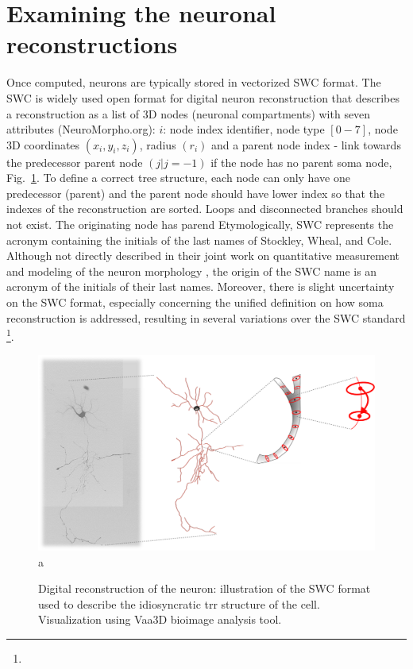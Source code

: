 \section{Examining the neuronal reconstructions}
Once computed, neurons are typically stored in vectorized SWC format. The SWC \cite{cannon1998line,ascoli2007neuromorpho} is widely used open format for digital neuron reconstruction that describes a reconstruction as a list of 3D nodes (neuronal compartments) with seven attributes (NeuroMorpho.org):  $i$: node index identifier, node type $[0-7]$, node 3D coordinates $(x_i,y_i,z_i)$, radius $(r_i)$ and a parent node index - link towards the predecessor parent node $(j | j=-1)$ if the node has no parent soma node, Fig.~\ref{ch1__fig5}. To define a correct tree structure, each node can only have one predecessor (parent) and the parent node should have lower index so that the indexes of the reconstruction are sorted. Loops and disconnected branches should not exist. The originating node has parend  Etymologically, SWC represents the acronym containing the initials of the last names of Stockley, Wheal, and Cole. Although not directly described in their joint work on quantitative measurement and modeling of the neuron morphology \cite{stockley1993system}, the origin of the SWC name is an acronym of the initials of their last names. Moreover, there is slight uncertainty on the SWC format, especially concerning the unified definition on how soma reconstruction is addressed, resulting in several variations over the SWC standard \footnote{}.
\begin{figure}
	\begin{center}
		\includegraphics[width=\textwidth]{ch1_fig5} \\
		a 
	\end{center}
	\vspace{-3ex}
	\caption{Digital reconstruction of the neuron: illustration of the SWC format used to describe the idiosyncratic trr structure of the cell. Visualization using Vaa3D \cite{peng2010automatic} bioimage analysis tool.}
	\vspace{-1ex}
	\label{ch1__fig5}
\end{figure}

